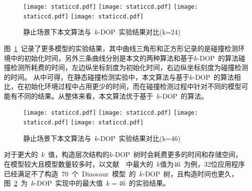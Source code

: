 \begin{figure}[htbp] 
\centering
{}
{  
   \texttt{[image: staticcd.pdf]}
}
{  
    \texttt{[image: staticcd.pdf]}
}\linebreak %
{  
   \texttt{[image: staticcd.pdf]}
}
{  
   \texttt{[image: staticcd.pdf]}
}
\caption{静止场景下本文算法与~$k$-DOP~实验结果对比(k=24)}
\label{fig:chart:exps:kdop:kcbp:k24}
\end{figure}

图~\ref{fig:chart:exps:kdop:kcbp:k24}~记录了更多模型的实验结果，其中曲线三角形和正方形记录的是碰撞检测环境中的初始化时间，另外三条曲线分别是本文的两种算法和基于$k$-DOP~的算法碰撞检测所耗费的时间，左边纵坐标刻度为初始化时间，右边纵坐标刻度为碰撞检测的时间。
从中可得，在静态碰撞检测实验中，本文算法与基于$k$-DOP~的算法相比，在初始化环境过程中占用更少的时间，而在碰撞检测过程中针对不同的模型可能有不同的结果。从整体来看，本文算法优于基于~$k$-DOP~的算法。

\begin{figure}[htbp] 
\centering
{}
{  
   \texttt{[image: staticcd.pdf]}
}
{  
    \texttt{[image: staticcd.pdf]}
}\linebreak %
{  
   \texttt{[image: staticcd.pdf]}
}
{  
   \texttt{[image: staticcd.pdf]}
}
\caption{静止场景下本文算法与~$k$-DOP~实验结果对比(k=46)}
\label{fig:chart:exps:kdop:kcbp:k46}
\end{figure}

对于更大的~$k$~值，构造层次结构的$k$-DOP~树时会耗费更多的时间和存储空间，在模型较大且模型数量较多时，以文献~~中最大的~$k$值为46~为例，32位应用程序已经满足不了构造~70~个~Dinosaur~模型~的~$k$-DOP~树，且构造时间也更久，图~\ref{fig:chart:exps:kdop:kcbp:k46}~为~$k$-DOP~实现中的最大值~$k=46$~的实验结果。

